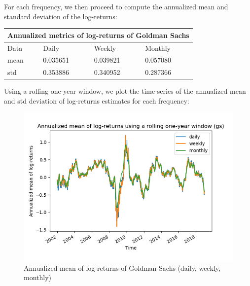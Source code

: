 \documentclass[10pt]{article}
\newenvironment{exercise}[2][Exercise]{\begin{trivlist}
  \item[\hskip \labelsep {\bfseries #1}\hskip \labelsep {\bfseries #2.}]}{\end{trivlist}}
\begin{document}
\begin{exercise}{4}
	\bigbreak	
	
	For each frequency, we then proceed to compute the annualized mean and standard deviation of the log-returns:
	
	\bigbreak
	
	\begin{tabular}{ |p{3cm}||p{3cm}|p{3cm}|p{3cm}|  }
		\hline
	 	\multicolumn{4}{|c|}{Annualized metrics of log-returns of Goldman Sachs} \\
	 	\hline
	 	Data & Daily & Weekly & Monthly\\
 		\hline
 		mean  &  0.035651 & 0.039821 & 0.057080\\
 		std & 0.353886 & 0.340952 & 0.287366\\
 		\hline
	\end{tabular}
	
	\bigbreak	
	
	Using a rolling one-year window, we plot the time-series of the annualized mean and std deviation of log-returns estimates for each frequency:
	
	\begin{figure}[H]
	
		\centering
		\includegraphics[scale=0.5]{Figures/problem4d_mean_gs.png}	
		\caption{Annualized mean of log-returns of Goldman Sachs (daily, weekly, monthly)}	
		\label{fig:problem3d_mean_gs}
	
	\end{figure}
	
	\begin{figure}[H]
	

\end{figure}
\end{exercise}
\end{document}
